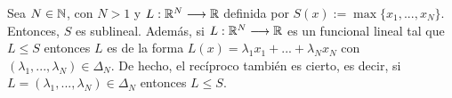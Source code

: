 	\begin{lemaBox}\label{lema2.1}
		Sea $ N \in \mathbb{N} $, con $ N > 1 $ y $ L: \mathbb{R}^N \longrightarrow \mathbb{R} $ definida por $ S(x):=\max\{x_1,...,x_N\}$. Entonces, $ S $ es sublineal. Además, si $ L:\mathbb{R}^N \longrightarrow \mathbb{R} $ es un funcional lineal tal que $ L \leq S $ entonces $ L $ es de la forma $ L(x) = \lambda_1 x_1 + ... + \lambda_N x_N $ con $ (\lambda_1,...,\lambda_N) \in \Delta_N$. De hecho, el recíproco también es cierto, es decir, si $ L =  (\lambda_1,...,\lambda_N) \in \Delta_N $ entonces $ L \leq S $.
		
		
	\end{lemaBox}
